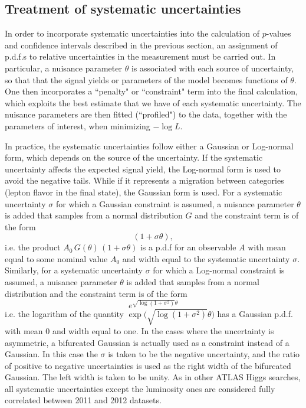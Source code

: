 \subsection{Treatment of systematic uncertainties}
\label{subsec:nuisance}
In order to incorporate systematic uncertainties into the calculation
of $p$-values and confidence intervals described in the previous section,
an assignment of p.d.f.s to relative uncertainties in the measurement
must be carried out.
In particular, a nuisance parameter $\theta$ is associated with each source
of uncertainty, so that that the signal yields or parameters of the model
becomes functions of $\theta$. One then incorporates a ``penalty" or ``constraint"
term into the final calculation, which exploits the best estimate that we have
of each systematic uncertainty. The nuisance parameters are then fitted (``profiled")
to the data, together with the parameters of interest, when minimizing $-\log L$.
 
In practice, the systematic uncertainties follow either a Gaussian or Log-normal 
form, which depends on the source of the uncertainty. 
If the systematic uncertainty affects the expected signal yield,
the Log-normal form is used to avoid the negative tails. While if it represents
a migration between categories (lepton flavor in the final state), the Gaussian
form is used. For a systematic uncertainty $\sigma$ for which a Gaussian constraint 
is assumed, a nuisance parameter $\theta$ is added that samples from a normal 
distribution $G$ and the constraint term is of the form
\[
    (1 + \sigma\theta),
\]
i.e. the product $A_0 \, G(\theta)\,(1+\sigma\theta)$ is a p.d.f for an observable 
$A$ with mean equal to some nominal value $A_0$ and width equal to the systematic
uncertainty $\sigma$. Similarly, for a systematic uncertainty $\sigma$ for which
a Log-normal constraint is assumed, a nuisance parameter $\theta$ is added
that samples from a normal distribution and the constraint term is of the form
\[
    e^{\sqrt{\log(1+\sigma^2)}\theta}
\]
i.e. the logarithm of the quantity $\exp({\sqrt{\log(1+\sigma^2)}\theta)}$ has
a Gaussian p.d.f. with mean 0 and width equal to one. In the cases where the
uncertainty is asymmetric, a bifurcated Gaussian is actually used as a
constraint instead of a Gaussian. In this case the $\sigma$ is taken to be the
negative uncertainty, and the ratio of positive to negative uncertainties is used
as the right width of the bifurcated Gaussian. The left width is taken to be unity.
As in other ATLAS Higgs searches, all systematic uncertainties except the 
luminosity ones are considered fully correlated between 2011 and 2012 datasets.
 
